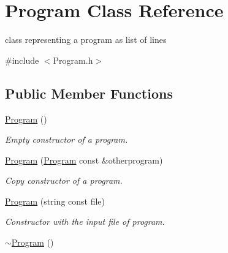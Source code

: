 \hypertarget{class_program}{\section{Program Class Reference}
\label{class_program}
}


class representing a program as list of lines  




{\ttfamily \#include $<$Program.\-h$>$}

\subsection*{Public Member Functions}
\begin{DoxyCompactItemize}
\item 
\hypertarget{class_program_aaefaa0df08f3484476fc4d61e97acbdc}{\hyperlink{class_program_aaefaa0df08f3484476fc4d61e97acbdc}{Program} ()}\label{class_program_aaefaa0df08f3484476fc4d61e97acbdc}

\begin{DoxyCompactList}\small\item\em Empty constructor of a program. \end{DoxyCompactList}\item 
\hypertarget{class_program_a9918fe797bf830c47a652c81f449c35c}{\hyperlink{class_program_a9918fe797bf830c47a652c81f449c35c}{Program} (\hyperlink{class_program}{Program} const \&otherprogram)}\label{class_program_a9918fe797bf830c47a652c81f449c35c}

\begin{DoxyCompactList}\small\item\em Copy constructor of a program. \end{DoxyCompactList}\item 
\hypertarget{class_program_aabe3dfc72075de14b189b22b0e33ff23}{\hyperlink{class_program_aabe3dfc72075de14b189b22b0e33ff23}{Program} (string const file)}\label{class_program_aabe3dfc72075de14b189b22b0e33ff23}

\begin{DoxyCompactList}\small\item\em Constructor with the input file of program. \end{DoxyCompactList}\item 
\hypertarget{class_program_a986aef1c50e1d338a3315a47ba6df549}{\hyperlink{class_program_a986aef1c50e1d338a3315a47ba6df549}{$\sim$\-Program} ()}\label{class_program_a986aef1c50e1d338a3315a47ba6df549}


\end{DoxyCompactItemize}
